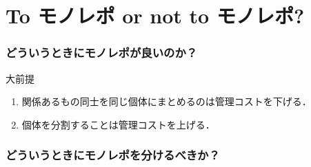\section{To モノレポ or not to モノレポ?}

\begin{frame}
    \frametitle{どういうときにモノレポが良いのか？}
    \small
    \begin{block}{大前提}
        \begin{enumerate}
            \item<2-> 関係あるもの同士を同じ個体にまとめるのは管理コストを下げる．
            \item<3-> 個体を分割することは管理コストを上げる．
        \end{enumerate}
    \end{block}
\end{frame}

\begin{frame}
    \frametitle{どういうときにモノレポを分けるべきか？}
\end{frame}


